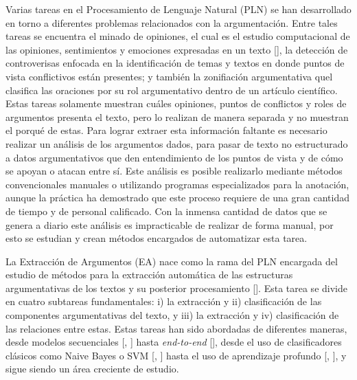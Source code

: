 
Varias tareas en el Procesamiento de Lenguaje Natural (PLN) se han desarrollado en 
torno a diferentes problemas relacionados con 
la argumentación. Entre tales tareas se encuentra el minado de opiniones, el cual es el 
estudio computacional de las opiniones, sentimientos y emociones expresadas en un texto 
[\cite{liu2010sentiment}], la detección de controverisas enfocada en la identificación de 
temas y textos en donde puntos de vista conflictivos están presentes; y también la zonifiación
argumentativa quel clasifica las oraciones por su rol argumentativo dentro de un artículo
científico. Estas tareas solamente muestran cuáles opiniones, puntos de conflictos y roles 
de argumentos 
presenta el texto, pero lo realizan de manera separada y no muestran el porqué de estas. 
Para lograr extraer esta información faltante es necesario realizar un 
análisis de los argumentos dados, para pasar de texto no estructurado a datos argumentativos 
que den entendimiento de los puntos de vista y de cómo se apoyan o atacan entre sí. Este análisis
es posible realizarlo mediante métodos convencionales manuales o utilizando programas
especializados para la anotación, aunque la práctica ha demostrado que este proceso requiere 
de una gran cantidad de tiempo y de personal calificado. Con la inmensa cantidad de datos 
que se genera a diario este análisis es impracticable de realizar de forma manual, por esto se 
estudian y crean métodos encargados de automatizar esta tarea.


La Extracción de Argumentos (EA) nace como la rama del PLN encargada
del estudio de métodos para la extracción automática de las estructuras argumentativas de 
los textos y su posterior procesamiento [\cite{lawrence2020argument}]. Esta tarea se divide en 
cuatro subtareas fundamentales: i) la extracción y ii) clasificación de las componentes 
argumentativas del texto, y iii) la extracción y 
iv) clasificación de las relaciones entre estas. Estas tareas han sido abordadas de diferentes maneras,
desde modelos secuenciales [\cite{palau2009argumentation}, \cite{goudas2015argument}] hasta 
\emph{end-to-end} [\cite{eger2017neural}], desde el uso de clasificadores clásicos 
como Naive Bayes o SVM [\cite{niculae2017argument}, \cite{stab2017parsing}] hasta el uso de 
aprendizaje profundo [\cite{galassi2021deep}, \cite{mayer2020transformer}], y sigue 
siendo un área creciente de estudio.


